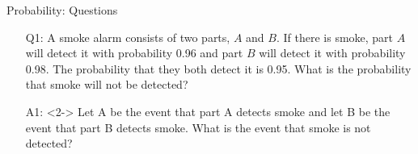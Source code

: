 \documentclass[10pt, xcolor=table]{beamer}
\begin{document}
%
%
%
%

\begin{frame}{Probability: Questions}
\begin{itemize}
  \setlength{\itemsep}{15pt}
\item[Q1:] A smoke alarm consists of two parts, $A$ and $B$. If there is smoke, part $A$ will detect it with probability 0.96 and part $B$ will detect it with probability 0.98. The probability that they both detect it is 0.95. What is the probability that smoke will not be detected?
\item[A1:]<2-> \color{red}
Let A be the event that part A detects smoke and let B be the event that part B detects smoke. What is the event that smoke is not detected?\\
\medskip
{}
\end{itemize}
\end{frame}
\end{document}
